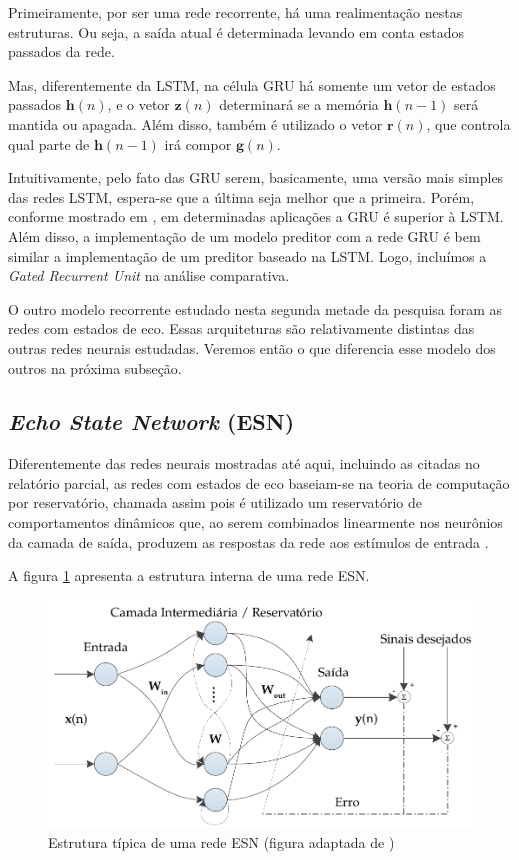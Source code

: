 \documentclass[a4paper, 12pt]{article}
\begin{document}
Primeiramente, por ser uma rede recorrente, há uma realimentação nestas estruturas. Ou seja, a saída atual é determinada levando em conta estados passados da rede.

Mas, diferentemente da LSTM, na célula GRU há somente um vetor de estados passados $\mathbf{h}(n)$, e o vetor $\mathbf{z}(n)$ determinará se a memória $\mathbf{h}(n-1)$ será mantida ou apagada. Além disso, também é utilizado o vetor $\mathbf{r}(n)$, que controla qual parte de $\mathbf{h}(n-1)$ irá compor $\mathbf{g}(n)$. 

Intuitivamente, pelo fato das GRU serem, basicamente, uma versão mais simples das redes LSTM, espera-se que a última seja melhor que a primeira. Porém, conforme mostrado em \cite{cho2014learning}, em determinadas aplicações a GRU é superior à LSTM. Além disso, a implementação de um modelo preditor com a rede GRU é bem similar a implementação de um preditor baseado na LSTM. Logo, incluímos a \textit{Gated Recurrent Unit} na análise comparativa. 

O outro modelo recorrente estudado nesta segunda metade da pesquisa foram as redes com estados de eco. Essas arquiteturas são relativamente distintas das outras redes neurais estudadas. Veremos então o que diferencia esse modelo dos outros na próxima subseção.

\subsection{\textit{Echo State Network} (ESN)}

Diferentemente das redes neurais mostradas até aqui, incluindo as citadas no relatório parcial, as redes com estados de eco baseiam-se na teoria de computação por reservatório, chamada assim pois é utilizado um reservatório de comportamentos dinâmicos que, ao serem combinados linearmente nos neurônios da camada de saída, produzem as respostas da rede aos estímulos de entrada \cite{boccato2013novas}. 

A figura \ref{fig:esn-model} apresenta a estrutura interna de uma rede ESN.
\begin{figure}[H]
\centering
\includegraphics[scale = 0.8]{esn-network.pdf}
\caption{Estrutura típica de uma rede ESN (figura adaptada de \cite{boccato2013novas}) }
\label{fig:esn-model}
\end{figure}
\end{document}
